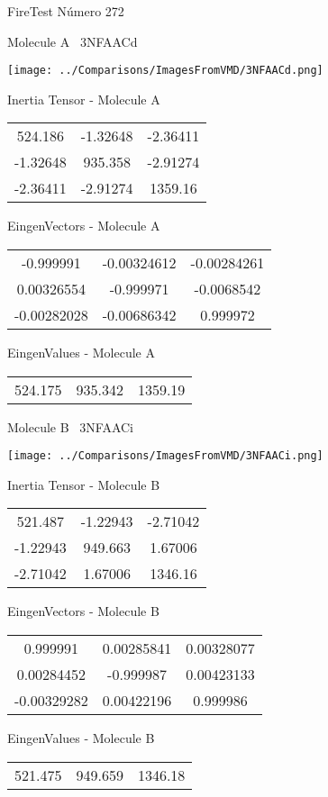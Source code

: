 \vtab[-3cm]
\begin{center}
{\large FireTest \tab Número 272}
\end{center}
\begin{multicols}{2}
\begin{center}

Molecule A \
3NFAACd

\texttt{[image: ../Comparisons/ImagesFromVMD/3NFAACd.png]}

Inertia Tensor - Molecule A \\
\begin{tabular}{|c c c|}
524.186	 & 	-1.32648	 & 	-2.36411	 \\
-1.32648	 & 	935.358	 & 	-2.91274	 \\
-2.36411	 & 	-2.91274	 & 	1359.16
\end{tabular}

\vtab
 EingenVectors - Molecule A     \\
\begin{tabular}{|c c c|}
-0.999991	 & 	-0.00324612	 & 	-0.00284261	 \\
0.00326554	 & 	-0.999971	 & 	-0.0068542	 \\
-0.00282028	 & 	-0.00686342	 & 	0.999972
\end{tabular}

\vtab
 EingenValues - Molecule A     \\
\begin{tabular}{|c c c|}
524.175	 & 	935.342	 & 	1359.19	 \\
\end{tabular}
\columnbreak

Molecule B \
3NFAACi

\texttt{[image: ../Comparisons/ImagesFromVMD/3NFAACi.png]}

Inertia Tensor - Molecule B \\
\begin{tabular}{|c c c|}
521.487	 & 	-1.22943	 & 	-2.71042	 \\
-1.22943	 & 	949.663	 & 	1.67006	 \\
-2.71042	 & 	1.67006	 & 	1346.16
\end{tabular}

\vtab
 EingenVectors - Molecule B     \\
\begin{tabular}{|c c c|}
0.999991	 & 	0.00285841	 & 	0.00328077	 \\
0.00284452	 & 	-0.999987	 & 	0.00423133	 \\
-0.00329282	 & 	0.00422196	 & 	0.999986
\end{tabular}

\vtab
 EingenValues - Molecule B     \\
\begin{tabular}{|c c c|}
521.475	 & 	949.659	 & 	1346.18	 \\
\end{tabular}

\end{center}
\end{multicols}

